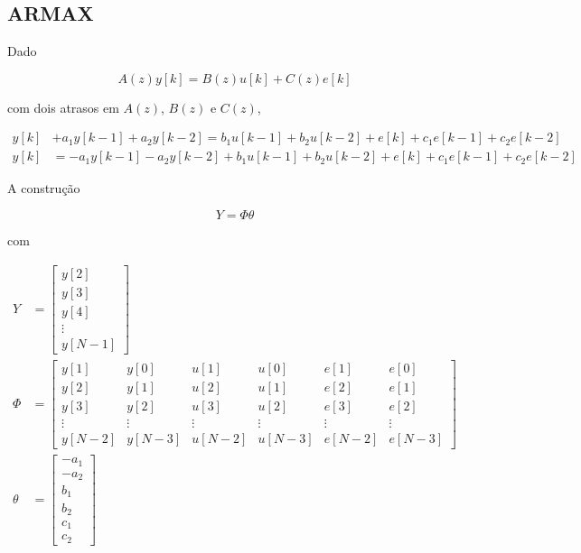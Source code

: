 \documentclass{article}
\begin{document}
\subsection*{ARMAX}

Dado

\begin{equation*}
    A(z)y[k] = B(z)u[k] + C(z)e[k]
\end{equation*}

com dois atrasos em $A(z)$, $B(z)$ e $C(z)$,

\begin{align*}
    y[k]& + a_1y[k-1] + a_2y[k-2] = b_1u[k-1] + b_2u[k-2] + e[k] + c_1e[k-1] + c_2e[k-2] \\
    y[k]& = -a_1y[k-1] - a_2y[k-2] + b_1u[k-1] + b_2u[k-2] + e[k] + c_1e[k-1] + c_2e[k-2]
\end{align*}

A construção

\begin{equation*}
    Y = \Phi\theta
\end{equation*}

com

\begin{align*}
    Y &=
    \begin{bmatrix}
    y[2] \\
    y[3] \\
    y[4] \\
    \vdots \\
    y[N-1]
    \end{bmatrix} \\
    \Phi &=
    \begin{bmatrix}
    y[1] & y[0] & u[1] & u[0] & e[1] & e[0] \\
    y[2] & y[1] & u[2] & u[1] & e[2] & e[1] \\
    y[3] & y[2] & u[3] & u[2] & e[3] & e[2] \\
    \vdots & \vdots & \vdots & \vdots & \vdots & \vdots \\
    y[N-2] & y[N-3] & u[N-2] & u[N-3] & e[N-2] & e[N-3]
    \end{bmatrix} \\
    \theta &=
    \begin{bmatrix}
    -a_1 \\
    -a_2 \\
    b_1 \\
    b_2 \\
    c_1 \\
    c_2
    \end{bmatrix}
\end{align*}
\end{document}
